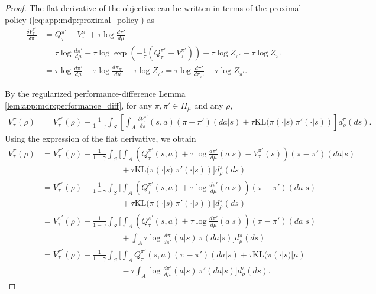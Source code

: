 \documentclass{amsart}
\theoremstyle{definition}
\begin{document}
\begin{proof}
The flat derivative of the objective can be written in terms of the proximal
policy (\ref{eq:app:mdp:proximal_policy}) as
\begin{align}
\frac{\delta V_\tau^{\pi'}}{\delta \pi}
&=
Q_\tau^{\pi'}-V_\tau^{\pi'}
+
\tau \log \frac{d\pi'}{d\mu}
\nonumber \\
&=
\tau \log \frac{d\pi'}{d\mu}
-
\tau
\log
\exp\left(
-\frac{1}{\tau}
\left(Q_\tau^{\pi'}-V_\tau^{\pi'}\right)
\right)
+
\tau \log Z_{\pi'}
-
\tau \log Z_{\pi'}
\nonumber \\
&=
\tau \log \frac{d\pi'}{d\mu}
-
\tau \log \frac{d\pi_{\pi'}}{d\mu}
-
\tau \log Z_{\pi'}
=
\tau \log \frac{d\pi'}{d\pi_{\pi'}}
-
\tau \log Z_{\pi'} .
\label{eq:sandwich-flat-derivative}
\end{align}

By the regularized performance-difference Lemma \ref{lem:app:mdp:performance_diff}, for any $\pi,\pi' \in \Pi_\mu$ and
any $\rho$,
\begin{align}
V_\tau^\pi(\rho)
&=
V_\tau^{\pi'}(\rho)
+
\frac{1}{1-\gamma}
\int_S
\left[
\int_A
\frac{\delta V_\tau^{\pi'}}{\delta \pi}(s,a)
(\pi-\pi')(da| s)
+
\tau \mathrm{KL}(\pi(\cdot | s)| \pi'(\cdot | s))
\right]
d_\rho^\pi(ds).
\label{eq:sandwich-performance-difference}
\end{align}
Using the expression of the flat derivative, we obtain
\begin{align}
V_\tau^\pi(\rho)
&=
V_\tau^{\pi'}(\rho)
+
\frac{1}{1-\gamma}
\int_S
\bigg[
\int_A
\left(
Q_\tau^{\pi'}(s,a)
+
\tau \log \frac{d\pi'}{d\mu}(a|s)
-
V_\tau^{\pi'}(s)
\right)
(\pi-\pi')(da| s)
\nonumber \\
&\hspace{4cm}
+
\tau \mathrm{KL}(\pi(\cdot | s)| \pi'(\cdot |s))
\bigg]
d_\rho^\pi(ds)
\nonumber \\
&=
V_\tau^{\pi'}(\rho)
+
\frac{1}{1-\gamma}
\int_S
\bigg[
\int_A
\left(
Q_\tau^{\pi'}(s,a)
+
\tau \log \frac{d\pi'}{d\mu}(a|s)
\right)
(\pi-\pi')(da| s)
\nonumber \\
&\hspace{4cm}
+
\tau \mathrm{KL}(\pi(\cdot | s)| \pi'(\cdot |s))
\bigg]
d_\rho^\pi(ds)
\nonumber \\
&=
V_\tau^{\pi'}(\rho)
+
\frac{1}{1-\gamma}
\int_S
\bigg[
\int_A
\left(
Q_\tau^{\pi'}(s,a)
+
\tau \log \frac{d\pi'}{d\mu}(a | s)
\right)
(\pi-\pi')(da| s)
\nonumber \\
&\hspace{4cm}
+
\int_A
\tau \log \frac{d\pi}{d\pi'}(a | s)
\,\pi(da| s)
\bigg]
d_\rho^\pi(ds)
\nonumber \\
&=
V_\tau^{\pi'}(\rho)
+
\frac{1}{1-\gamma}
\int_S
\bigg[
\int_A
Q_\tau^{\pi'}(s,a)
(\pi-\pi')(da| s)
+
\tau \mathrm{KL}(\pi(\cdot |s)| \mu)
\nonumber \\
&\hspace{4cm}
-
\tau
\int_A
\log \frac{d\pi'}{d\mu}(a|s)
\,\pi'(da| s)
\bigg]
d_\rho^\pi(ds).
\label{eq:sandwich-expanded-difference}
\end{align}


\end{proof}
\end{document}
